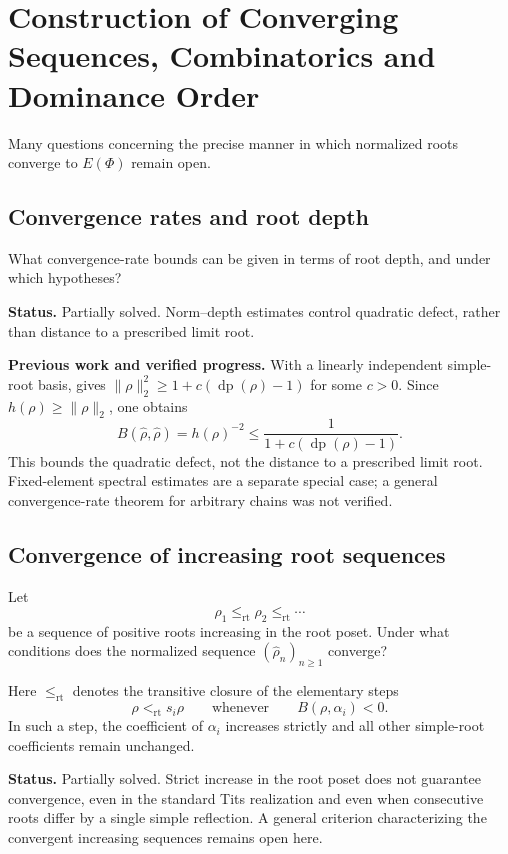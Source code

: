 \documentclass[11pt,reqno]{amsart}
\newcommand{\depth}{\operatorname{dp}}
\theoremstyle{plain}
\theoremstyle{definition}
\theoremstyle{remark}
\numberwithin{equation}{section}
\begin{document}
\section{Construction of Converging Sequences,
Combinatorics and Dominance Order}

Many questions concerning the precise manner in which
normalized roots converge to $E(\Phi)$ remain open.

\subsection{Convergence rates and root depth}

What convergence-rate bounds can be given in terms of root depth,
and under which hypotheses?


\par\medskip
\noindent\textbf{Status.} Partially solved. Norm--depth estimates control quadratic defect, rather than distance to a prescribed limit root.

\par\medskip
\noindent\textbf{Previous work and verified progress.}
With a linearly independent simple-root basis,
\cite[Lemma~2.10]{HLR} gives
$\|\rho\|_2^2\geq 1+c(\depth(\rho)-1)$ for some $c>0$.
Since $h(\rho)\geq\|\rho\|_2$, one obtains
\[
B(\widehat\rho,\widehat\rho)=h(\rho)^{-2}
\leq\frac{1}{1+c(\depth(\rho)-1)}.
\]
This bounds the quadratic defect, not the distance to a prescribed
limit root. Fixed-element spectral estimates are a separate special case;
a general convergence-rate theorem for arbitrary chains was not verified.

\subsection{Convergence of increasing root sequences}

Let
\[
\rho_1\leq_{\mathrm{rt}}\rho_2\leq_{\mathrm{rt}}\cdots
\]
be a sequence of positive roots increasing in the root poset.
Under what conditions does the normalized sequence
$(\widehat{\rho}_n)_{n\geq1}$ converge?

Here $\leq_{\mathrm{rt}}$ denotes the transitive closure of the
elementary steps
\[
\rho<_{\mathrm{rt}}s_i\rho
\qquad\text{whenever}\qquad
B(\rho,\alpha_i)<0.
\]
In such a step, the coefficient of $\alpha_i$ increases strictly
and all other simple-root coefficients remain unchanged.

\par\medskip
\noindent\textbf{Status.}
Partially solved. Strict increase in the root poset does not
guarantee convergence, even in the standard Tits realization
and even when consecutive roots differ by a single simple
reflection. A general criterion characterizing the convergent
increasing sequences remains open here.
\end{document}
